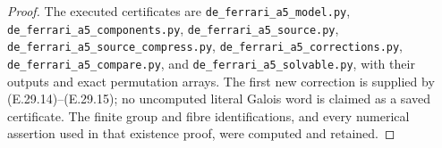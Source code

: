 \begin{proof}
The executed certificates are
\texttt{de\_ferrari\_a5\_model.py},
\texttt{de\_ferrari\_a5\_components.py},
\texttt{de\_ferrari\_a5\_source.py},
\texttt{de\_ferrari\_a5\_source\_compress.py},
\texttt{de\_ferrari\_a5\_corrections.py},
\texttt{de\_ferrari\_a5\_compare.py}, and
\texttt{de\_ferrari\_a5\_solvable.py}, with their
outputs and exact permutation arrays. The first new
correction is supplied by (E.29.14)--(E.29.15); no
uncomputed literal Galois word is claimed as a saved
certificate. The finite group and fibre identifications,
and every numerical assertion used in that existence
proof, were computed and retained.
\end{proof}
